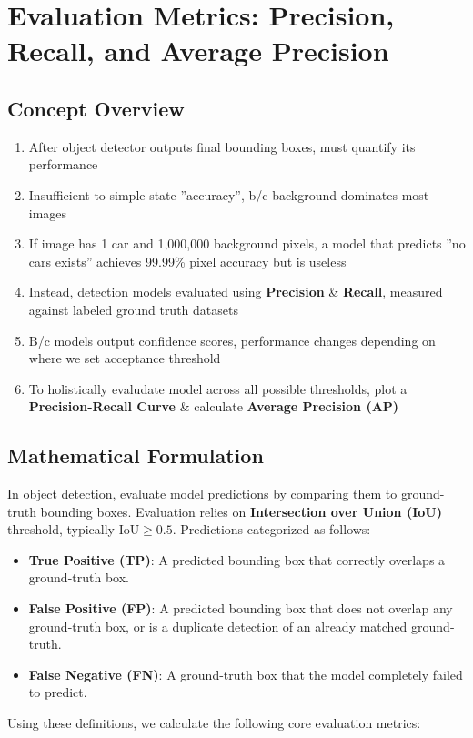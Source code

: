 \documentclass[12pt]{article}
\begin{document}
\section{Evaluation Metrics: Precision, Recall, and Average Precision}

\subsection{Concept Overview}
\begin{enumerate}
    \item After object detector outputs final bounding boxes, must quantify its performance
    \item Insufficient to simple state ''accuracy'', b/c background dominates most images
    \item If image has 1 car and 1,000,000 background pixels, a model that predicts ''no cars exists'' achieves 99.99\% pixel accuracy but is useless
    \item Instead, detection models evaluated using \textbf{Precision} \& \textbf{Recall}, measured against labeled ground truth datasets
    \item B/c models output confidence scores, performance changes depending on where we set acceptance threshold
    \item To holistically evaludate model across all possible thresholds, plot a \textbf{Precision-Recall Curve} \& calculate \textbf{Average Precision (AP)}
\end{enumerate}

\subsection{Mathematical Formulation}
In object detection, evaluate model predictions by comparing them to ground-truth bounding boxes. Evaluation relies on \textbf{Intersection over Union (IoU)} threshold, typically $\text{IoU} \ge 0.5$. Predictions categorized as follows:
\begin{itemize}
    \item \textbf{True Positive (TP)}: A predicted bounding box that correctly overlaps a ground-truth box.
    \item \textbf{False Positive (FP)}: A predicted bounding box that does not overlap any ground-truth box, or is a duplicate detection of an already matched ground-truth.
    \item \textbf{False Negative (FN)}: A ground-truth box that the model completely failed to predict.
\end{itemize}
Using these definitions, we calculate the following core evaluation metrics:
\end{document}

